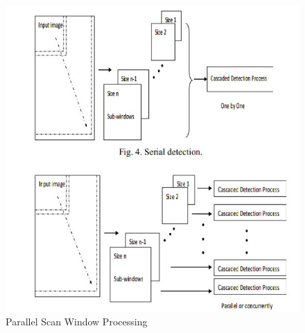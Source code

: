 \begin{itemize}
\begin{figure}[h]
  \centering
  \includegraphics[width=\linewidth]{figs/scan.jpg}
  \caption{Parallel Scan Window Processing \textnormal{\small }  }
  \label{fig:scan}
\end{figure}



\end{itemize}

